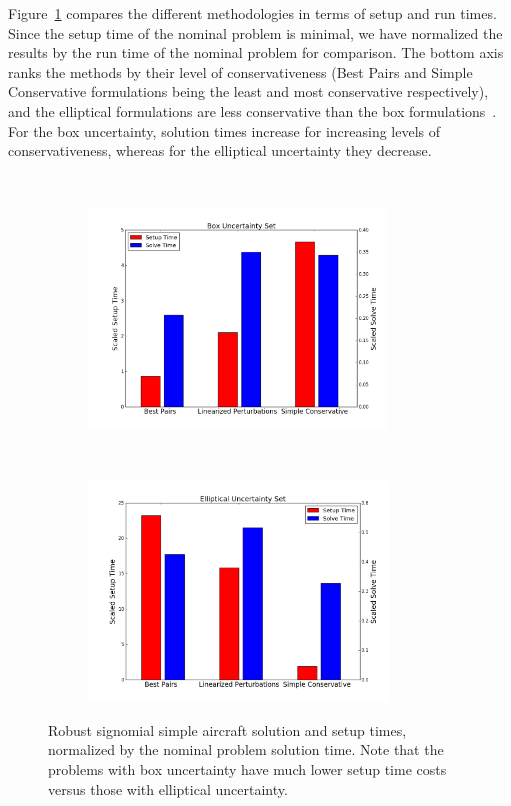 Figure~\ref{compare_signomial} compares the different methodologies in terms of setup and
run times. Since the setup time of the nominal problem is minimal, we have
normalized the results by the run time of the nominal problem for comparison.
The bottom axis ranks the methods by their level of conservativeness (Best Pairs
and Simple Conservative formulations being the least and most conservative respectively),
and the elliptical formulations are less conservative than the box formulations~\cite{Saab2018}.
For the box uncertainty, solution times increase for increasing levels of conservativeness,
whereas for the elliptical uncertainty they decrease.

\ \\
\begin{figure}[ht]
    \centering
    \captionsetup{justification=centering, font=small}
    \begin{subfigure}{0.49\textwidth}
        \centering
        \includegraphics[height=2.3in]{signomial_simple_flight/box_times.png}
    \end{subfigure}
    ~
    \begin{subfigure}{0.49\textwidth}
        \centering
        \includegraphics[height=2.3in]{signomial_simple_flight/ell_times.png}
    \end{subfigure}
    \caption{Robust signomial simple aircraft solution and setup times, normalized by the
    nominal problem solution time. Note that the problems with box uncertainty have much lower setup
    time costs versus those with elliptical uncertainty.}
    \label{compare_signomial}
\end{figure}


